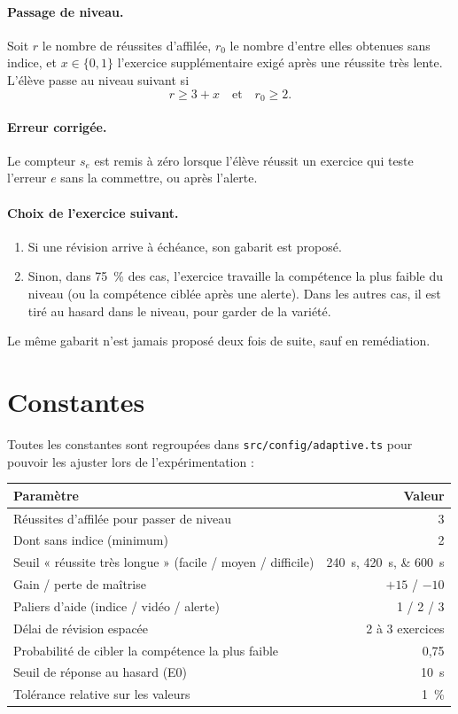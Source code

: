 \documentclass[11pt,a4paper]{report}
\newcommand{\code}[1]{\texttt{#1}}
\begin{document}
\paragraph{Passage de niveau.} Soit $r$ le nombre de réussites d'affilée, $r_0$ le nombre d'entre elles obtenues sans indice, et $x \in \{0, 1\}$ l'exercice supplémentaire exigé après une réussite très lente. L'élève passe au niveau suivant si
\begin{equation}
  r \ge 3 + x \quad\text{et}\quad r_0 \ge 2.
\end{equation}

\paragraph{Erreur corrigée.} Le compteur $s_e$ est remis à zéro lorsque l'élève réussit un exercice qui teste l'erreur $e$ sans la commettre, ou après l'alerte.

\paragraph{Choix de l'exercice suivant.}
\begin{enumerate}
  \item Si une révision arrive à échéance, son gabarit est proposé.
  \item Sinon, dans \SI{75}{\percent} des cas, l'exercice travaille la compétence la plus faible du niveau (ou la compétence ciblée après une alerte). Dans les autres cas, il est tiré au hasard dans le niveau, pour garder de la variété.
\end{enumerate}
Le même gabarit n'est jamais proposé deux fois de suite, sauf en remédiation.

\section{Constantes}
Toutes les constantes sont regroupées dans \code{src/config/adaptive.ts} pour pouvoir les ajuster lors de l'expérimentation :
\begin{center}
\small
\begin{tabular}{lr}
  \toprule
  Paramètre & Valeur \\
  \midrule
  Réussites d'affilée pour passer de niveau & 3 \\
  Dont sans indice (minimum) & 2 \\
  Seuil « réussite très longue » (facile / moyen / difficile) & \SIlist{240;420;600}{\second} \\
  Gain / perte de maîtrise & $+15$ / $-10$ \\
  Paliers d'aide (indice / vidéo / alerte) & 1 / 2 / 3 \\
  Délai de révision espacée & 2 à 3 exercices \\
  Probabilité de cibler la compétence la plus faible & 0,75 \\
  Seuil de réponse au hasard (E0) & \SI{10}{\second} \\
  Tolérance relative sur les valeurs & \SI{1}{\percent} \\
  \bottomrule
\end{tabular}
\end{center}
\end{document}
